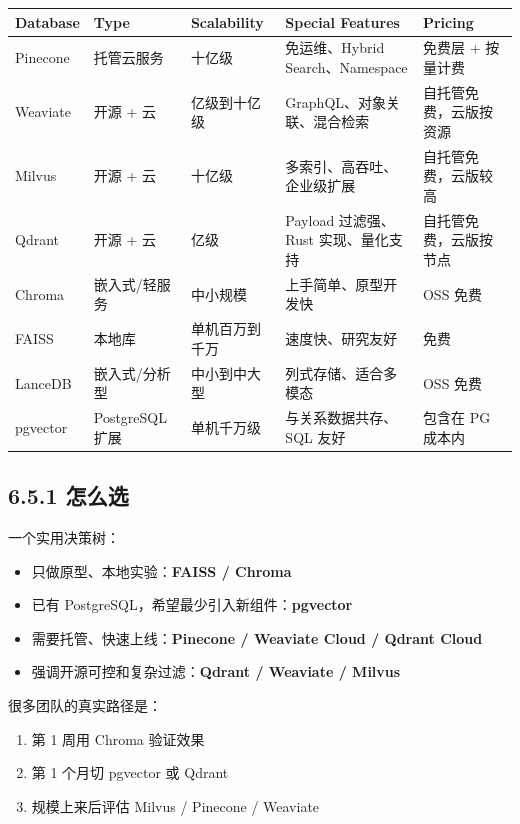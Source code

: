 \begingroup
\scriptsize
\setlength{\tabcolsep}{3pt}
\begin{longtable}{|p{}|p{}|p{}|p{}|p{}|}
\hline
Database & Type & Scalability & Special Features & Pricing \\ \hline
Pinecone & 托管云服务 & 十亿级 & 免运维、Hybrid Search、Namespace & 免费层 + 按量计费 \\ \hline
Weaviate & 开源 + 云 & 亿级到十亿级 & GraphQL、对象关联、混合检索 & 自托管免费，云版按资源 \\ \hline
Milvus & 开源 + 云 & 十亿级 & 多索引、高吞吐、企业级扩展 & 自托管免费，云版较高 \\ \hline
Qdrant & 开源 + 云 & 亿级 & Payload 过滤强、Rust 实现、量化支持 & 自托管免费，云版按节点 \\ \hline
Chroma & 嵌入式/轻服务 & 中小规模 & 上手简单、原型开发快 & OSS 免费 \\ \hline
FAISS & 本地库 & 单机百万到千万 & 速度快、研究友好 & 免费 \\ \hline
LanceDB & 嵌入式/分析型 & 中小到中大型 & 列式存储、适合多模态 & OSS 免费 \\ \hline
pgvector & PostgreSQL 扩展 & 单机千万级 & 与关系数据共存、SQL 友好 & 包含在 PG 成本内 \\ \hline
\end{longtable}
\endgroup

\subsection{6.5.1 怎么选}

一个实用决策树：


\begin{itemize}[leftmargin=2em]
\item 只做原型、本地实验：\textbf{FAISS / Chroma}
\item 已有 PostgreSQL，希望最少引入新组件：\textbf{pgvector}
\item 需要托管、快速上线：\textbf{Pinecone / Weaviate Cloud / Qdrant Cloud}
\item 强调开源可控和复杂过滤：\textbf{Qdrant / Weaviate / Milvus}
\end{itemize}

很多团队的真实路径是：


\begin{enumerate}[leftmargin=2em]
\item 第 1 周用 Chroma 验证效果
\item 第 1 个月切 pgvector 或 Qdrant
\item 规模上来后评估 Milvus / Pinecone / Weaviate
\end{enumerate}

